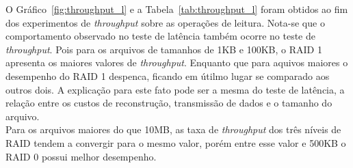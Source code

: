 	
	O Gráfico~\ref{fig:throughput_l} e a Tabela~\ref{tab:throughput_l} foram obtidos ao fim dos experimentos de \textit{throughput} sobre as operações de leitura. Nota-se que o comportamento observado no teste de latência também ocorre no teste de \textit{throughput}. Pois para os arquivos de tamanhos de 1KB e 100KB, o RAID 1 apresenta os maiores valores de \textit{throughput}. Enquanto que para aquivos maiores o desempenho do RAID 1 despenca, ficando em útilmo lugar se comparado aos outros dois. A explicação para este fato pode ser a mesma do teste de latência, a relação entre os custos de reconstrução, transmissão de dados e o tamanho do arquivo.
	\\
	
	Para os arquivos maiores do que 10MB, as taxa de \textit{throughput} dos três níveis de RAID tendem a convergir para o mesmo valor, porém entre esse valor e 500KB o RAID 0 possui melhor desempenho. 
	\\
	
